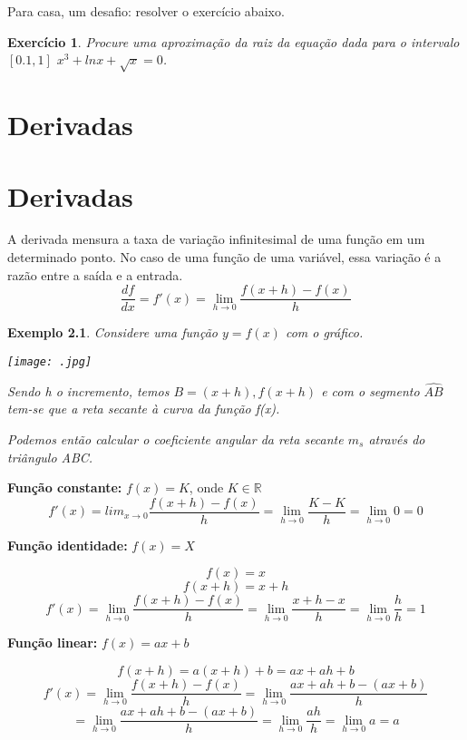 \documentclass{book}
\numberwithin{defn}{chapter}
\newtheorem{exe}{Exemplo}
\numberwithin{exe}{chapter}
\newtheorem{ex}{Exercício}
\numberwithin{ex}{chapter}
\numberwithin{obs}{chapter}
\numberwithin{fato}{chapter}
\numberwithin{resp}{chapter}
\begin{document}
Para casa, um desafio: resolver o exercício abaixo.
\begin{ex}
    Procure uma aproximação da raiz da equação dada para o intervalo $[0.1,1]$ $x^3+lnx+\sqrt{x}=0$.
\end{ex}


\chapter{Derivadas} %
\chapter{Derivadas} %
A derivada mensura a taxa de variação infinitesimal de uma função em um determinado ponto. No caso de uma função de uma variável, essa variação é a razão entre a saída e a entrada.
\[\frac{df}{dx} = f'(x) = \lim_{h \to 0} \frac{f(x+h) - f(x)}{h}\]


\begin{exe}
    Considere uma função $y=f(x)$ com o gráfico.
    
\begin{center}\texttt{[image: .jpg]}\end{center}

Sendo h o incremento, temos $B=(x+h),f(x+h)$ e com o segmento $\widehat{AB}$ tem-se que a reta secante à curva da função f(x).

Podemos então calcular o coeficiente angular da reta secante $m_s$ através do triângulo ABC.
\[\]

\end{exe}


\textbf{Função constante:} \(f(x) = K\), onde \(K \in \mathbb{R}\)
\[f'(x) = lim_{x \to 0} \frac{f(x+h) - f(x)}{h} = \lim_{h \to 0} \frac{K - K}{h} = \lim_{h \to 0} 0 = 0\]

\textbf{Função identidade:} \(f(x) = X\)

\[f(x) = x\] 
\[f(x + h) = x + h\]
\[f'(x) = \lim_{h \to 0} \frac{f(x + h) - f(x)}{h} = \lim_{h \to 0} \frac{x + h - x}{h} = \lim_{h \to 0} \frac{h}{h} = 1\]

\textbf{Função linear:} \(f(x) = ax + b\)

\[f(x+h) = a(x + h) + b = ax + ah + b\]
\[f'(x) = \lim_{h \to 0} \frac{f(x + h) - f(x)}{h} = \lim_{h \to 0} \frac{ax + ah + b - (ax + b)}{h}\]
\[= \lim_{h \to 0} \frac{ax + ah + b - (ax + b)}{h} = \lim_{h \to 0} \frac{ah}{h} = \lim_{h \to 0} a = a\]
\end{document}
